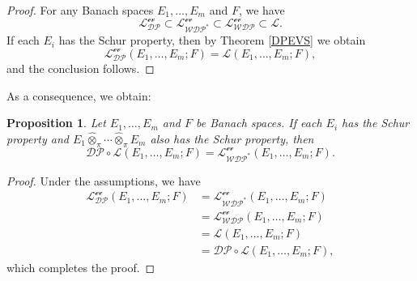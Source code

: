 \documentclass[12 pt]{article}%
\newtheorem{proposition}[theorem]{Proposition}
\newtheorem{final remark}[theorem]{Final Remark}
\begin{document}
\begin{proof}
	For any Banach spaces $E_1,\dots, E_m$ and $F$, we have
	\begin{equation*}
		\mathcal{L_{DP}^{\text{ev}}} \subset \mathcal{L_{WDP^{*}}^{\text{ev}}} \subset \mathcal{L_{WDP}^{\text{ev}}} \subset \mathcal{L}.
	\end{equation*}
	If each $E_i$ has the Schur property, then by Theorem \ref{DPEVS} we obtain
	\begin{equation*}
		\mathcal{L_{DP}^{\text{ev}}}(E_1,\dots, E_m; F) = \mathcal{L}(E_1,\dots, E_m; F),
	\end{equation*}
	and the conclusion follows.
\end{proof}

As a consequence, we obtain:

\begin{proposition}
	Let $E_1,\dots, E_m$ and $F$ be Banach spaces. If each $E_i$ has the Schur property and $E_1 \hat{\otimes}_{\pi} \cdots \hat{\otimes}_{\pi} E_m$ also has the Schur property, then
	\begin{equation*}
		\mathcal{DP} \circ \mathcal{L}(E_1,\dots, E_m; F)
		= \mathcal{L_{WDP^{*}}^{\text{ev}}}(E_1,\dots, E_m; F).
	\end{equation*}
\end{proposition}

\begin{proof}
	Under the assumptions, we have
	\begin{align*}
		\mathcal{L_{DP}^{\text{ev}}}(E_1,\dots, E_m; F)
		&= \mathcal{L_{WDP^{*}}^{\text{ev}}}(E_1,\dots, E_m; F)\\
		&= \mathcal{L_{WDP}^{\text{ev}}}(E_1,\dots, E_m; F)\\
		&= \mathcal{L}(E_1,\dots, E_m; F)\\
		&= \mathcal{DP} \circ \mathcal{L}(E_1,\dots, E_m; F),
	\end{align*}
	which completes the proof.
\end{proof}
\end{document}
